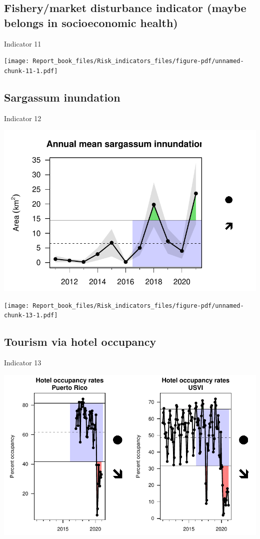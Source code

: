 \documentclass[
  letterpaper,
  oneside,
  open=any]{scrbook}
\begin{document}
\subsection{Fishery/market disturbance indicator (maybe belongs in
socioeconomic
health)}\label{fisherymarket-disturbance-indicator-maybe-belongs-in-socioeconomic-health}

Indicator 11

\texttt{[image: Report\_book\_files/Risk\_indicators\_files/figure-pdf/unnamed-chunk-11-1.pdf]}

\subsection{Sargassum inundation}\label{sargassum-inundation}

Indicator 12

\includegraphics{Report_book_files/Risk_indicators_files/figure-pdf/unnamed-chunk-12-1.pdf}

\texttt{[image: Report\_book\_files/Risk\_indicators\_files/figure-pdf/unnamed-chunk-13-1.pdf]}

\subsection{Tourism via hotel
occupancy}\label{tourism-via-hotel-occupancy}

Indicator 13

\includegraphics{Report_book_files/Risk_indicators_files/figure-pdf/unnamed-chunk-14-1.pdf}
\end{document}
